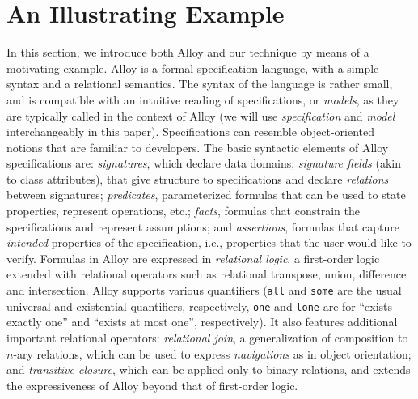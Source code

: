 \section{An Illustrating Example}

In this section, we introduce both Alloy and our technique by means of a motivating example. Alloy is a formal specification language, with a simple syntax and a relational semantics. The syntax of the language is rather small, and is compatible with an intuitive reading of specifications, or \emph{models}, as they are typically called in the context of Alloy \cite{Jackson2006} (we will use \emph{specification} and \emph{model} interchangeably in this paper). Specifications can resemble object-oriented notions that are familiar to developers. The basic syntactic elements of Alloy specifications are: \emph{signatures}, which declare data domains; \emph{signature fields} (akin to class attributes), that give structure to specifications and declare \emph{relations} between signatures; \emph{predicates}, parameterized formulas that can be used to state properties, represent operations, etc.; \emph{facts}, formulas that constrain the specifications and represent assumptions; and \emph{assertions}, formulas that capture \emph{intended} properties of the specification, i.e., properties that the user would like to verify. Formulas in Alloy are expressed in \emph{relational logic}, a first-order logic extended with relational operators such as relational transpose, union, difference and intersection. Alloy supports various quantifiers (\texttt{all} and \texttt{some} are the usual universal and existential quantifiers, respectively, \texttt{one} and \texttt{lone} are for ``exists exactly one'' and ``exists at most one'', respectively). It also features additional important relational operators: \emph{relational join}, a generalization of  composition to $n$-ary relations, which can be used to express \emph{navigations} as in object orientation; and \emph{transitive closure}, which can be applied only to binary relations, and extends the expressiveness of Alloy beyond that of first-order logic. 


